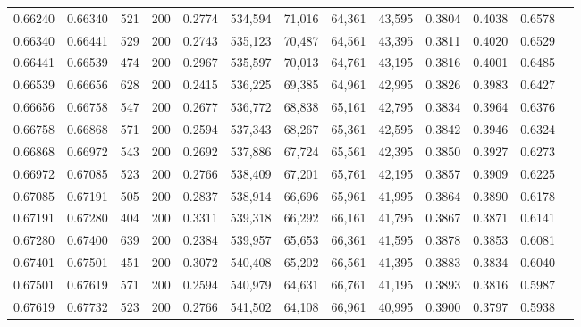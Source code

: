\begin{tabular}{rrrrrrrrrrrrr}
0.66240 & 0.66340 &    521 & 200 &                                     0.2774 & 534,594 &  71,016 &  64,361 &  43,595 & 0.3804 & 0.4038 & 0.6578 \\
0.66340 & 0.66441 &    529 & 200 &                                     0.2743 & 535,123 &  70,487 &  64,561 &  43,395 & 0.3811 & 0.4020 & 0.6529 \\
0.66441 & 0.66539 &    474 & 200 &                                     0.2967 & 535,597 &  70,013 &  64,761 &  43,195 & 0.3816 & 0.4001 & 0.6485 \\
0.66539 & 0.66656 &    628 & 200 &                                     0.2415 & 536,225 &  69,385 &  64,961 &  42,995 & 0.3826 & 0.3983 & 0.6427 \\
0.66656 & 0.66758 &    547 & 200 &                                     0.2677 & 536,772 &  68,838 &  65,161 &  42,795 & 0.3834 & 0.3964 & 0.6376 \\
0.66758 & 0.66868 &    571 & 200 &                                     0.2594 & 537,343 &  68,267 &  65,361 &  42,595 & 0.3842 & 0.3946 & 0.6324 \\
0.66868 & 0.66972 &    543 & 200 &                                     0.2692 & 537,886 &  67,724 &  65,561 &  42,395 & 0.3850 & 0.3927 & 0.6273 \\
0.66972 & 0.67085 &    523 & 200 &                                     0.2766 & 538,409 &  67,201 &  65,761 &  42,195 & 0.3857 & 0.3909 & 0.6225 \\
0.67085 & 0.67191 &    505 & 200 &                                     0.2837 & 538,914 &  66,696 &  65,961 &  41,995 & 0.3864 & 0.3890 & 0.6178 \\
0.67191 & 0.67280 &    404 & 200 &                                     0.3311 & 539,318 &  66,292 &  66,161 &  41,795 & 0.3867 & 0.3871 & 0.6141 \\
0.67280 & 0.67400 &    639 & 200 &                                     0.2384 & 539,957 &  65,653 &  66,361 &  41,595 & 0.3878 & 0.3853 & 0.6081 \\
0.67401 & 0.67501 &    451 & 200 &                                     0.3072 & 540,408 &  65,202 &  66,561 &  41,395 & 0.3883 & 0.3834 & 0.6040 \\
0.67501 & 0.67619 &    571 & 200 &                                     0.2594 & 540,979 &  64,631 &  66,761 &  41,195 & 0.3893 & 0.3816 & 0.5987 \\
0.67619 & 0.67732 &    523 & 200 &                                     0.2766 & 541,502 &  64,108 &  66,961 &  40,995 & 0.3900 & 0.3797 & 0.5938 \\

\end{tabular}
